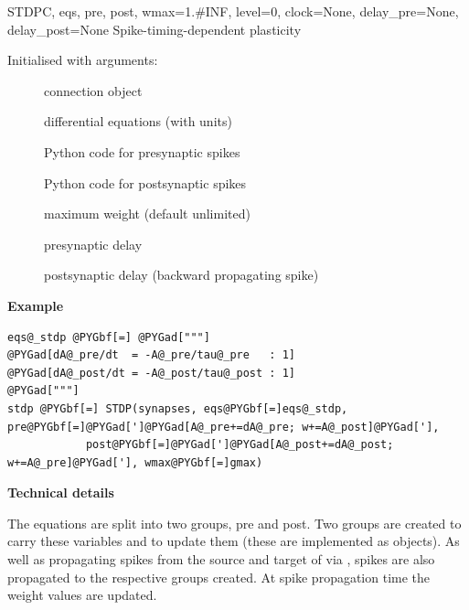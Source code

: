 \documentclass[letterpaper,10pt,english]{manual}
\begin{document}
\hypertarget{brian.STDP}{}\begin{classdesc}{STDP}{C, eqs, pre, post, wmax=1.\#INF, level=0, clock=None, delay\_pre=None, delay\_post=None}
Spike-timing-dependent plasticity

Initialised with arguments:
\begin{description}
\item[]
connection object

\item[]
differential equations (with units)

\item[]
Python code for presynaptic spikes

\item[]
Python code for postsynaptic spikes

\item[]
maximum weight (default unlimited)

\item[]
presynaptic delay

\item[]
postsynaptic delay (backward propagating spike)

\end{description}

\textbf{Example}

\begin{Verbatim}[commandchars=@\[\]]
eqs@_stdp @PYGbf[=] @PYGad["""]
@PYGad[dA@_pre/dt  = -A@_pre/tau@_pre   : 1]
@PYGad[dA@_post/dt = -A@_post/tau@_post : 1]
@PYGad["""]
stdp @PYGbf[=] STDP(synapses, eqs@PYGbf[=]eqs@_stdp, pre@PYGbf[=]@PYGad[']@PYGad[A@_pre+=dA@_pre; w+=A@_post]@PYGad['],
            post@PYGbf[=]@PYGad[']@PYGad[A@_post+=dA@_post; w+=A@_pre]@PYGad['], wmax@PYGbf[=]gmax)
\end{Verbatim}

\textbf{Technical details}

The equations are split into two groups, pre and post. Two groups are created
to carry these variables and to update them (these are implemented as
\hyperlink{brian.NeuronGroup}{} objects). As well as propagating spikes from the source
and target of  via , spikes are also propagated to the respective
groups created. At spike propagation time the weight values are updated.
\end{classdesc}
\end{document}
